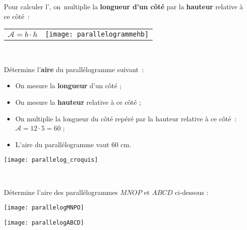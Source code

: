 \begin{aconnaitre}
Pour calculer l’, on multiplie la \textbf{\textcolor{H1}{longueur d'un côté}} par la \textbf{\textcolor{C2}{hauteur}} relative à ce côté :

\vspace{1em}

\begin{tabularx}{\textwidth}{XX}
{\large $\mathcal{A} = b \cdot h$} & \texttt{[image: parallelogrammehb]} \\
 \end{tabularx} \\

\end{aconnaitre}


\vspace{4em}

\begin{methode*1}


\begin{exemple*1}
Détermine l’\textbf{aire} du parallélogramme suivant :
\begin{minipage}[c]{0.65\textwidth}
\begin{itemize}
 \item On mesure la \textbf{\textcolor{H1}{longueur}} d'un côté ;
 \item On mesure la \textbf{\textcolor{C2}{hauteur}} relative à ce côté ;
 \item On multiplie la longueur du côté repéré par la hauteur relative à ce côté : $\mathcal{A} = 12 \cdot 5 = 60$ ;
 \item L'aire du parallélogramme vaut 60 cm.
 \end{itemize}
 \end{minipage} \hfill%
 \begin{minipage}[c]{0.26\textwidth}
 \texttt{[image: parallelog\_croquis]}
 \end{minipage} \\
\end{exemple*1}

\exercice 
Détermine l’aire des parallélogrammes $MNOP$ et $ABCD$ ci-dessous :
\begin{colenumerate}{2}
 \item 
 
 \texttt{[image: parallelogMNPO]}
 \item 
 
 \texttt{[image: parallelogABCD]}
 \end{colenumerate}

\end{methode*1}

